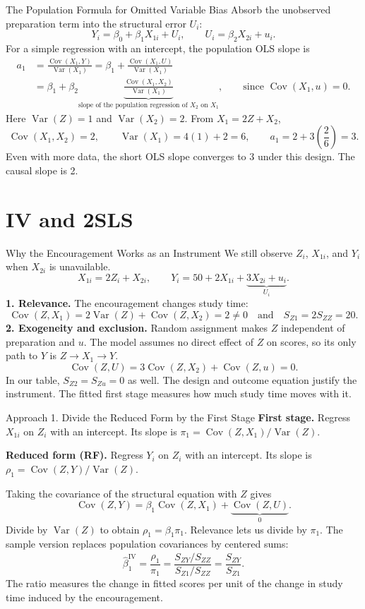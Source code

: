 \documentclass[10pt,aspectratio=169]{beamer}
\newcommand{\Cov}{\operatorname{Cov}}
\newcommand{\Var}{\operatorname{Var}}
\begin{document}
\begin{frame}{The Population Formula for Omitted Variable Bias}
Absorb the unobserved preparation term into the structural error $U_i$:
\[
Y_i=\beta_0+\beta_1X_{1i}+U_i,\qquad U_i=\beta_2X_{2i}+u_i.
\]
For a simple regression with an intercept, the population OLS slope is
\[
\begin{aligned}
a_1
&=\frac{\Cov(X_1,Y)}{\Var(X_1)}
 =\beta_1+\frac{\Cov(X_1,U)}{\Var(X_1)}\\
&=\beta_1+\beta_2\underbrace{\frac{\Cov(X_1,X_2)}{\Var(X_1)}}_
 {\text{slope of the population regression of $X_2$ on $X_1$}},
 \qquad\text{since }\Cov(X_1,u)=0.
\end{aligned}
\]
Here $\Var(Z)=1$ and $\Var(X_2)=2$. From $X_1=2Z+X_2$,
\[
\Cov(X_1,X_2)=2,\qquad
\Var(X_1)=4(1)+2=6,\qquad
a_1=2+3\left(\frac{2}{6}\right)=3.
\]
Even with more data, the short OLS slope converges to 3 under this design. The causal slope is 2.
\end{frame}

\section{IV and 2SLS}

\begin{frame}{Why the Encouragement Works as an Instrument}
We still observe $Z_i$, $X_{1i}$, and $Y_i$ when $X_{2i}$ is unavailable.
\[
X_{1i}=2Z_i+X_{2i},
\qquad
Y_i=50+2X_{1i}+\underbrace{3X_{2i}+u_i}_{U_i}.
\]
\textbf{1. Relevance.} The encouragement changes study time:
\[
\Cov(Z,X_1)=2\Var(Z)+\Cov(Z,X_2)=2\neq0
\quad\text{and}\quad S_{Z1}=2S_{ZZ}=20.
\]
\textbf{2. Exogeneity and exclusion.} Random assignment makes $Z$ independent of preparation and $u$. The model assumes no direct effect of $Z$ on scores, so its only path to $Y$ is $Z\to X_1\to Y$.
\[
\Cov(Z,U)=3\Cov(Z,X_2)+\Cov(Z,u)=0.
\]
In our table, $S_{Z2}=S_{Zu}=0$ as well. The design and outcome equation justify the instrument. The fitted first stage measures how much study time moves with it.
\end{frame}

\begin{frame}{Approach 1. Divide the Reduced Form by the First Stage}
\textbf{First stage.} Regress $X_{1i}$ on $Z_i$ with an intercept. Its slope is
$\pi_1=\Cov(Z,X_1)/\Var(Z)$.
\medskip

\textbf{Reduced form (RF).} Regress $Y_i$ on $Z_i$ with an intercept. Its slope is
$\rho_1=\Cov(Z,Y)/\Var(Z)$.
\medskip

Taking the covariance of the structural equation with $Z$ gives
\[
\Cov(Z,Y)=\beta_1\Cov(Z,X_1)+\underbrace{\Cov(Z,U)}_{0}.
\]
Divide by $\Var(Z)$ to obtain $\rho_1=\beta_1\pi_1$. Relevance lets us divide by $\pi_1$. The sample version replaces population covariances by centered sums:
\[
\boxed{\hat\beta_1^{\mathrm{IV}}
=\frac{\hat\rho_1}{\hat\pi_1}
=\frac{S_{ZY}/S_{ZZ}}{S_{Z1}/S_{ZZ}}
=\frac{S_{ZY}}{S_{Z1}}.}
\]
The ratio measures the change in fitted scores per unit of the change in study time induced by the encouragement.
\end{frame}
\end{document}
